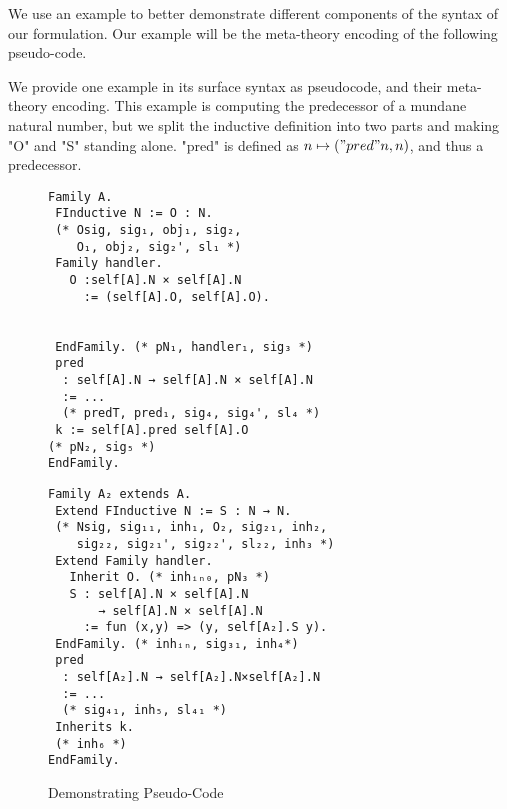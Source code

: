 We use an example to better demonstrate different components of the syntax of our formulation. Our example will be the meta-theory encoding of the following pseudo-code.

We provide one example in its surface syntax as pseudocode, and their meta-theory encoding. This example is computing the predecessor of a mundane natural number, but we split the inductive definition into two parts and making "O" and "S" standing alone. "pred" is defined as $n \mapsto ("pred" n, n)$, and thus a predecessor.




\begin{figure}[H]\label{fig:example-pseudocode}
\begin{minipage}[t]{0.5\linewidth}
\begin{verbatim}
Family A.
 FInductive N := O : N. 
 (* Osig, sig₁, obj₁, sig₂,
    O₁, obj₂, sig₂', sl₁ *)
 Family handler.
   O :self[A].N × self[A].N 
     := (self[A].O, self[A].O). 


 EndFamily. (* pN₁, handler₁, sig₃ *)
 pred 
  : self[A].N → self[A].N × self[A].N 
  := ... 
  (* predT, pred₁, sig₄, sig₄', sl₄ *) 
 k := self[A].pred self[A].O 
(* pN₂, sig₅ *)
EndFamily.
\end{verbatim}
  \end{minipage}
  \begin{minipage}[t]{0.45\linewidth}
\begin{verbatim}
Family A₂ extends A.
 Extend FInductive N := S : N → N.
 (* Nsig, sig₁₁, inh₁, O₂, sig₂₁, inh₂, 
    sig₂₂, sig₂₁', sig₂₂', sl₂₂, inh₃ *)
 Extend Family handler.
   Inherit O. (* inhᵢₙ₀, pN₃ *)
   S : self[A].N × self[A].N 
       → self[A].N × self[A].N 
     := fun (x,y) => (y, self[A₂].S y).
 EndFamily. (* inhᵢₙ, sig₃₁, inh₄*)
 pred 
  : self[A₂].N → self[A₂].N×self[A₂].N 
  := ... 
  (* sig₄₁, inh₅, sl₄₁ *)
 Inherits k. 
 (* inh₆ *)
EndFamily.
    \end{verbatim}
  \end{minipage}
  \caption{Demonstrating Pseudo-Code}
\end{figure}

